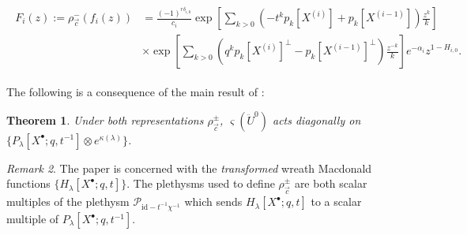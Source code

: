 \documentclass{amsart}
\newcommand{\cP}{\mathcal{P}}
\newcommand{\kb}{\kappa}
\newcommand{\id}{\mathrm{id}}
\newtheorem{thm}{Theorem}
\theoremstyle{remark}
\newtheorem{rem}[thm]{Remark}
\numberwithin{thm}{section}
\numberwithin{equation}{section}
\begin{document}
\begin{align}
\label{FCurrentDef}
\begin{split}
F_i(z):=\rho_{\vec{c}}^-(f_i(z))&=
\frac{(-1)^{r\delta_{i,0}}}{c_i}\exp\left[\sum_{k>0}\left(-t^{k}p_{k}[X^{(i)}]+p_{k}[X^{(i-1)}]\right)\frac{z^k}{k}\right]\\
&\times\exp\left[\sum_{k>0}\left(q^{k}p_{k}[X^{(i)}]^\perp-p_{k}[X^{(i-1)}]^\perp\right)\frac{z^{-k}}{k}\right]e^{-\alpha_i} z^{1-H_{i,0}}.
\end{split}
\end{align}

The following is a consequence of the main result of \cite{Wen}:
\begin{thm}\label{Eigenstates}
Under both representations $\rho_{\vec{c}}^\pm$, $\varsigma(\ddot{U}^0)$ acts diagonally on $\{P_\lambda[ X^\bullet ;q,t^{-1} ]\otimes e^{\kb(\lambda)}\}$.
\end{thm}

\begin{rem}\label{PlethExp}
The paper \cite{Wen} is concerned with the \textit{transformed} wreath Macdonald functions $\{H_\lambda[X^\bullet ;q,t]\}$.
The plethysms used to define $\rho_{\vec{c}}^\pm$ are both scalar multiples of the plethysm $\cP_{\id-t^{-1}\chi^{-1}}$ which sends $H_\lambda[X^\bullet; q,t]$ to a scalar multiple of $P_{\lambda}[ X^\bullet;q,t^{-1} ]$.
\end{rem}
\end{document}
